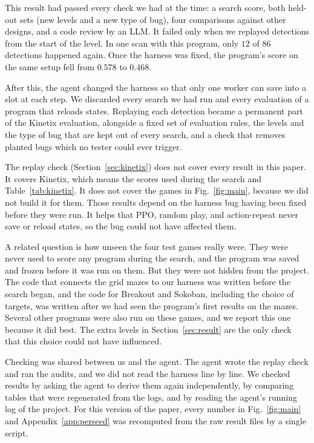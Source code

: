 \documentclass{article}
\begin{document}
This result had passed every check we had at the time: a search score, both held-out sets (new levels and a new type of bug), four comparisons
against other designs, and a code review by an LLM. It failed only when we replayed detections from the start of the level. In one
scan with this program, only $12$ of $86$ detections happened again. Once the harness was fixed, the program's score on
the same setup fell from $0.578$ to $0.468$.

After this, the agent changed the harness so that only one worker can save into a slot at each step. We discarded every
search we had run and every evaluation of a program that reloads states. Replaying each detection became a permanent
part of the Kinetix evaluation, alongside a fixed set of evaluation rules, the levels and the type of bug that are kept
out of every search, and a check that removes planted bugs which no tester could ever trigger.

The replay check (Section~\ref{sec:kinetix}) does not cover every result in this paper. It covers Kinetix, which means
the scores used during the search and Table~\ref{tab:kinetix}. It does not cover the games in Fig.~\ref{fig:main},
because we did not build it for them. Those results depend on the harness bug having been fixed before they were run. It helps that PPO, random play, and action-repeat never save or reload
states, so the bug could not have affected them.

A related question is how unseen the four test games really were. They were never used to score any program during the
search, and the program was saved and frozen before it was run on them. But they were not hidden from the project.
The code that connects the grid mazes to our harness was written before the search began, and the code for Breakout
and Sokoban, including the choice of targets, was written after we had seen the program's first results on the mazes.
Several other programs were also run on these games, and we report this one because it did best. The extra levels in
Section~\ref{sec:result} are the only check that this choice could not have influenced.

Checking was shared between us and the agent. The agent wrote the replay check and ran the audits, and we did not read
the harness line by line.
We checked results by asking the agent to derive them again independently, by comparing tables that were regenerated
from the logs, and by reading the agent's running log of the project. For this version of the paper, every number in
Fig.~\ref{fig:main} and Appendix~\ref{app:perseed} was recomputed from the raw result files by a single script.
\end{document}

